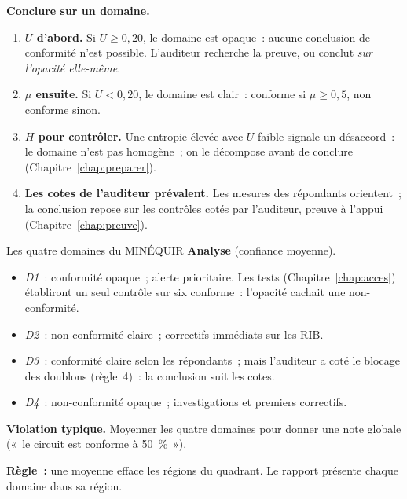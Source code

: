 \begin{boxprocedure}
\textbf{Conclure sur un domaine.}
\begin{enumerate}
    \item \textbf{$U$ d'abord.} Si $U \geq 0{,}20$, le domaine est opaque~:
          aucune conclusion de conformité n'est possible. L'auditeur
          recherche la preuve, ou conclut \emph{sur l'opacité elle-même}.
    \item \textbf{$\mu$ ensuite.} Si $U < 0{,}20$, le domaine est clair~:
          conforme si $\mu \geq 0{,}5$, non conforme sinon.
    \item \textbf{$H$ pour contrôler.} Une entropie élevée avec $U$ faible
          signale un désaccord~: le domaine n'est pas homogène~; on le
          décompose avant de conclure (Chapitre~\ref{chap:preparer}).
    \item \textbf{Les cotes de l'auditeur prévalent.} Les mesures des
          répondants orientent~; la conclusion repose sur les contrôles
          cotés par l'auditeur, preuve à l'appui (Chapitre~\ref{chap:preuve}).
\end{enumerate}
\end{boxprocedure}

\begin{boxlecture}{Les quatre domaines du MINÉQUIR}
\textbf{Analyse} (confiance moyenne).
\begin{itemize}
    \item \emph{D1}~: conformité opaque~; alerte prioritaire. Les tests
          (Chapitre~\ref{chap:acces}) établiront un seul contrôle sur six
          conforme~: l'opacité cachait une non-conformité.
    \item \emph{D2}~: non-conformité claire~; correctifs immédiats sur les
          RIB.
    \item \emph{D3}~: conformité claire selon les répondants~; mais
          l'auditeur a coté \NON{} le blocage des doublons (règle~4)~: la
          conclusion suit les cotes.
    \item \emph{D4}~: non-conformité opaque~; investigations et premiers
          correctifs.
\end{itemize}
\end{boxlecture}

\begin{boxalert}
\textbf{Violation typique.} Moyenner les quatre domaines pour donner une
note globale («~le circuit est conforme à 50~\%~»).

\smallskip
\textbf{Règle~:} une moyenne efface les régions du quadrant. Le rapport
présente chaque domaine dans sa région.
\end{boxalert}

